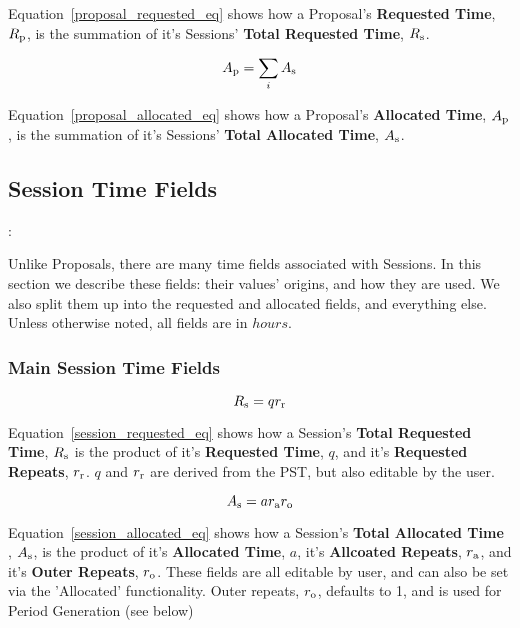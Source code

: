 \documentclass{article}
\begin{document}
Equation~\ref{proposal_requested_eq} shows how a Proposal's {\bf Requested Time}, $R_{\rm p}$, is the summation of it's Sessions' {\bf Total Requested Time}, $R_{\rm s}$.

\begin{equation}
\label{proposal_allocated_eq}
A_{\rm p} = \sum_i A_{\rm s}
\end{equation}

Equation~\ref{proposal_allocated_eq} shows how a Proposal's {\bf Allocated Time}, $A_{\rm p}$, is the summation of it's Sessions' {\bf Total Allocated Time},  $A_{\rm s}$.

\subsection{Session Time Fields}:

Unlike Proposals, there are many time fields associated with Sessions.  In this section we describe these fields: their values' origins, and how they are used.  We also split them up into the requested and allocated fields, and everything else.  Unless otherwise noted, all fields are in $hours$.

\subsubsection{Main Session Time Fields}

\begin{equation}
\label{session_requested_eq}
R_{\rm s} = q r_{\rm r}  
\end{equation}

Equation~\ref{session_requested_eq} shows how a Session's {\bf Total Requested Time}, $R_{\rm s}$ is the product of it's {\bf Requested Time}, $q$, and it's {\bf Requested Repeats}, $r_{\rm r}$. $q$ and $r_{\rm r}$ are derived from the PST, but also editable by the user.  

\begin{equation}
\label{session_allocated_eq}
A_{\rm s} = a r_{\rm a} r_{\rm o} 
\end{equation}

Equation~\ref{session_allocated_eq} shows how a Session's {\bf Total Allocated Time }, $A_{\rm s}$, is the product of it's {\bf Allocated Time}, $a$, it's {\bf Allcoated Repeats}, $r_{\rm a}$, and it's {\bf Outer Repeats}, $r_{\rm o}$.  These fields are all editable by user, and can also be set via the 'Allocated' functionality.  Outer repeats, $r_{\rm o}$, defaults to 1, and is used for Period Generation (see below)
\end{document}
